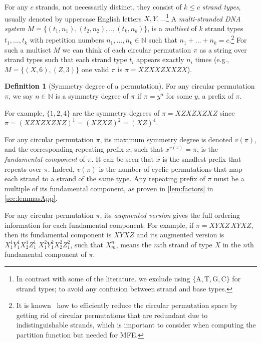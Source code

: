 \documentclass[11pt,letterpaper]{article}  \usepackage[margin=1in]{geometry}
\theoremstyle{definition}  \newtheorem{Definition}[theorem]{Definition}
\begin{document}
For any $c$ strands, not necessarily distinct, they consist of $k \leq c$ \emph{strand types}, usually denoted by uppercase English letters $X,Y,\ldots$\footnote{In contrast with some of the literature. we exclude using $\{\mathrm{A},\mathrm{T},\mathrm{G},\mathrm{C}\}$ for strand types; to avoid any confusion between strand and base types.}
A {\em multi-stranded DNA system} 
$M = \{(t_1,n_1),(t_2,n_2), ..,(t_k,n_k)\}$,  
is a \emph{multiset} of $k$ strand types $t_1,  ..., t_k$ with repetition numbers 
$n_1,  ..., n_k \in \mathbb{N}$ such that $n_1+ ...+n_k = c$.\footnote{It is known~\cite{sawada2003fast} how to efficiently reduce the circular permutation space by getting rid of  circular permutations that are redundant due to indistinguishable strands, which is important to consider when computing the  partition function but needed for MFE.} 
For such a multiset $M$
we can think of each circular permutation $\pi$  as a string over strand types such that each strand type $t_i$ appears exactly $n_i$ times (e.g., $M = \{(X,6),(Z,3)\}$ one valid $\pi$ is $\pi = XZXXZXXZX$). 



\begin{Definition}[Symmetry degree of a permutation] \label{def:sym}
	For any circular permutation $\pi$, we say $n \in \mathbb{N}$ is a symmetry degree of $\pi$ if $\pi = y^n$ for some $y$, a prefix of $\pi$. 
\end{Definition}

\noindent For example, $\{1,2,4\}$ are the symmetry degrees of $\pi = XZXZXZXZ$ since $\pi = (XZXZXZXZ)^1 = (XZXZ)^2 = (XZ)^4$.

For any circular permutation $\pi$, 
its maximum symmetry degree is denoted $v(\pi)$, and the corresponding repeating prefix $x$, such that $x^{v(\pi)} = \pi$, is the \emph{fundamental component} of $\pi$. 
It can be seen that $x$ is the smallest prefix that repeats over $\pi$. 
Indeed, $v(\pi)$ is the number of cyclic permutations that map each strand to a strand of the same type. 
Any repeating prefix of $\pi$ must be a multiple of its fundamental component, as proven in \cref{lem:factors} in \cref{sec:lemmasApp}.


\begin{remark}[Notation: $X_m^n$]
	For any circular permutation $\pi$, 
	its \emph{augmented version}  gives the full ordering information for each fundamental component. 
	For example, 
	if $\pi = XYXZ \, XYXZ$, then its fundamental component is $XYXZ$ and its augmented version is 
	$ X_1^1 Y_1^1 X_2^1 Z_1^1  \; X_1^2 Y_1^2 X_2^2 Z_1^2$, such that  $X_m^n$, means the $m$th strand of type $X$ in the $n$th fundamental component of $\pi$.   
\end{remark}
\end{document}
